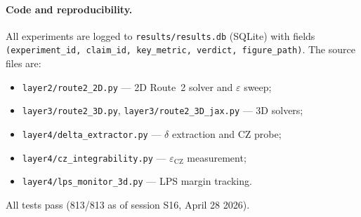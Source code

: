 \documentclass[11pt]{article}
\theoremstyle{definition}
\newcommand{\eps}{\varepsilon}
\newcommand{\CZ}{\mathrm{CZ}}
\begin{document}
\paragraph{Code and reproducibility.}
All experiments are logged to \texttt{results/results.db} (SQLite) with
fields \texttt{(experiment\_id, claim\_id, key\_metric, verdict, figure\_path)}.
The source files are:
\begin{itemize}[noitemsep]
  \item \texttt{layer2/route2\_2D.py} --- 2D Route~2 solver and $\eps$ sweep;
  \item \texttt{layer3/route2\_3D.py}, \texttt{layer3/route2\_3D\_jax.py} --- 3D solvers;
  \item \texttt{layer4/delta\_extractor.py} --- $\delta$ extraction and CZ probe;
  \item \texttt{layer4/cz\_integrability.py} --- $\eps_{\CZ}$ measurement;
  \item \texttt{layer4/lps\_monitor\_3d.py} --- LPS margin tracking.
\end{itemize}
All tests pass (813/813 as of session S16, April 28 2026).
\end{document}
